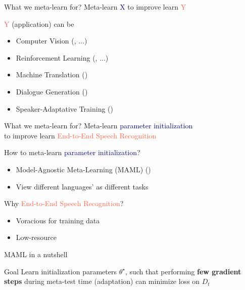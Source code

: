 \documentclass{beamer}
\begin{document}
\begin{frame}[t]{What we meta-learn for?}
  \centering Meta-learn \textcolor{navy}{X} to improve learn \textcolor{tomato}{Y}

  \flushleft \textcolor{tomato}{Y} (application) can be
  \begin{itemize}
    \item Computer Vision (\citealt{snell2017prototypical}, \citealt{rusu2018meta} ...)
    \item Reinforcement Learning (\citealt{eysenbach2018diversity}, \citealt{xu2018meta} ...)
    \item Machine Translation (\citealt{gu2018meta})
    \item Dialogue Generation (\citealt{mi2019meta})
    \item Speaker-Adaptative Training (\citealt{klejch2019speaker})
  \end{itemize}
\end{frame}

\begin{frame}[t]{What we meta-learn for?}
  \centering Meta-learn \textcolor{navy}{parameter initialization} \\ to improve learn \textcolor{tomato}{End-to-End Speech Recognition}

  \pause
  \flushleft How to meta-learn \textcolor{navy}{parameter initialization}?
  \begin{itemize}
    \item Model-Agnostic Meta-Learning (MAML) (\citealt{finn2017model})
    \item View different languages' as different tasks
  \end{itemize}

  \pause

  Why \textcolor{tomato}{End-to-End Speech Recognition}?
  \begin{itemize}
    \item Voracious for training data
    \item Low-resource 
  \end{itemize}
\end{frame}

\begin{frame}[t]{MAML in a nutshell}
  \begin{block}{Goal}
    Learn initialization parameters $\theta^\star$, such that performing \textbf{few gradient steps} during meta-test time (adaptation) can minimize loss on $D_t$
  \end{block}
  \flushright \hyperlink{overview of maml}{}
\end{frame}
\end{document}
